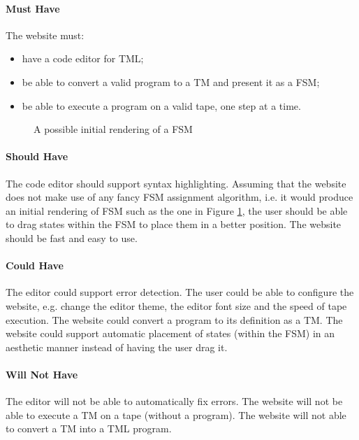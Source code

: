 \paragraph{Must Have} The website must:
\begin{itemize}
    \item have a code editor for TML;
    \item be able to convert a valid program to a TM and present it as a FSM;
    \item be able to execute a program on a valid tape, one step at a time.
\end{itemize}

\begin{figure}[htb]
    \centering
    \caption{A possible initial rendering of a FSM}
    \label{fig:bad_FSM}
\end{figure}

\paragraph{Should Have} The code editor should support syntax highlighting. Assuming that the website does not make use of any fancy FSM assignment algorithm, i.e. it would produce an initial rendering of FSM such as the one in Figure \ref{fig:bad_FSM}, the user should be able to drag states within the FSM to place them in a better position. The website should be fast and easy to use.

\paragraph{Could Have} The editor could support error detection. The user could be able to configure the website, e.g. change the editor theme, the editor font size and the speed of tape execution. The website could convert a program to its definition as a TM. The website could support automatic placement of states (within the FSM) in an aesthetic manner instead of having the user drag it.

\paragraph{Will Not Have} The editor will not be able to automatically fix errors. The website will not be able to execute a TM on a tape (without a program). The website will not able to convert a TM into a TML program.

